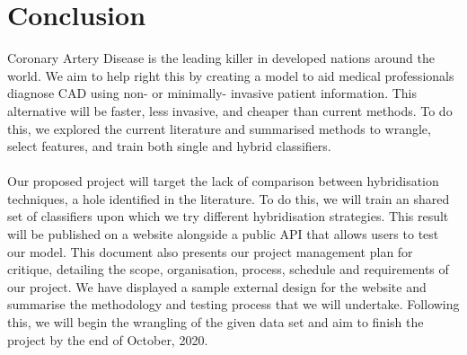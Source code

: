\documentclass[a4paper, 12pt]{article}
\begin{document}
\section{Conclusion}
Coronary Artery Disease is the leading killer in developed nations around the world. We aim to help right this by creating a model to aid medical professionals diagnose CAD using non- or minimally- invasive patient information. This alternative will be faster, less invasive, and cheaper than current methods. To do this, we explored the current literature and summarised methods to wrangle, select features, and train both single and hybrid classifiers. 
\\\\
Our proposed project will target the lack of comparison between hybridisation techniques, a hole identified in the literature. To do this, we will train an shared set of classifiers upon which we try different hybridisation strategies. This result will be published on a website alongside a public API that allows users to test our model. This document also presents our project management plan for critique, detailing the scope, organisation, process, schedule and requirements of our project. We have displayed a sample external design for the website and summarise the methodology and testing process that we will undertake. Following this, we will begin the wrangling of the given data set and aim to finish the project by the end of October, 2020.

\end{document}
